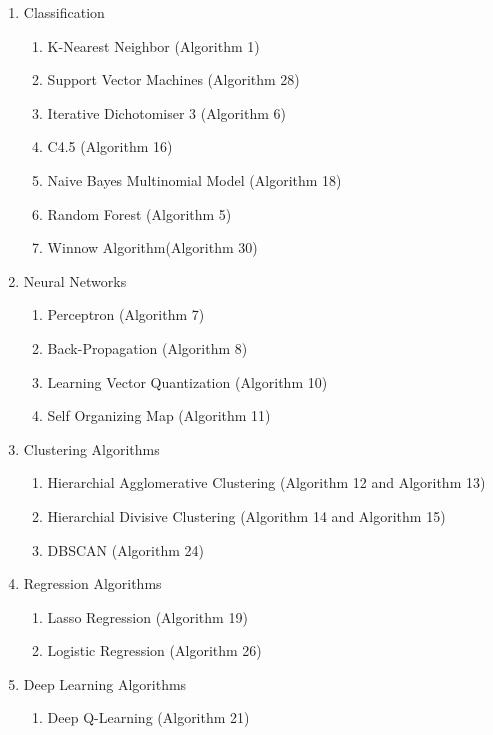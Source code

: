 \documentclass[a4paper]{article}
\begin{document}
\begin{enumerate}
\item Classification 
	\begin{enumerate}
	\item  K-Nearest Neighbor (Algorithm 1)
	\item Support Vector Machines (Algorithm 28)
	\item Iterative Dichotomiser 3 (Algorithm 6)
	\item C4.5 (Algorithm 16)
	\item Naive Bayes Multinomial Model (Algorithm 18)
	\item  Random Forest (Algorithm 5)
	\item Winnow Algorithm(Algorithm 30)
	
	\end{enumerate}
 

	
	
\item Neural Networks
\begin{enumerate}
	\item Perceptron (Algorithm 7)
	\item Back-Propagation (Algorithm 8) 
	\item Learning Vector Quantization (Algorithm 10)
	\item Self Organizing Map (Algorithm 11)
	
	
\end{enumerate}	

\item Clustering Algorithms
\begin{enumerate}
   \item Hierarchial Agglomerative Clustering (Algorithm 12 and Algorithm 13)
    \item Hierarchial Divisive Clustering (Algorithm 14 and Algorithm 15)
    \item DBSCAN (Algorithm 24)
\end{enumerate}

\item Regression Algorithms
\begin{enumerate}
   \item Lasso Regression (Algorithm 19)
 \item Logistic Regression (Algorithm 26)
\end{enumerate}

\item Deep Learning Algorithms
\begin{enumerate}
   \item Deep Q-Learning (Algorithm 21)
\end{enumerate}


\end{enumerate}
\end{document}

